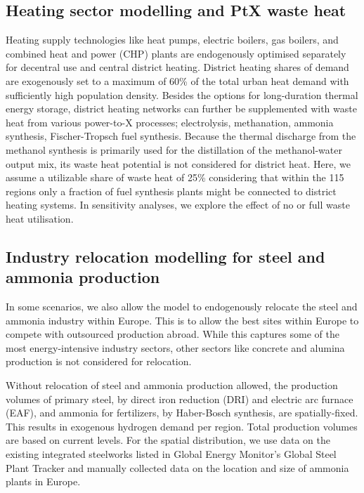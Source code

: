 \subsection*{Heating sector modelling and PtX waste heat}


Heating supply technologies like heat pumps, electric boilers, gas boilers, and
combined heat and power (CHP) plants are endogenously optimised separately for
decentral use and central district heating. District heating shares of demand
are exogenously set to a maximum  of 60\% of the total urban heat demand with
sufficiently high population density. Besides the options for long-duration
thermal energy storage, district heating networks can further be supplemented
with waste heat from various power-to-X processes; electrolysis, methanation,
ammonia synthesis, Fischer-Tropsch fuel synthesis. Because the thermal discharge
from the methanol synthesis is primarily used for the distillation of the
methanol-water output mix,\cite{brownUltralongdurationEnergyStorage2023} its
waste heat potential is not considered for district heat. Here, we assume a
utilizable share of waste heat of 25\% considering that within the 115 regions
only a fraction of fuel synthesis plants might be connected to district heating
systems. In sensitivity analyses, we explore the effect of no or full waste heat
utilisation.


\subsection*{Industry relocation modelling for steel and ammonia production}

In some scenarios, we also allow the model to endogenously relocate the steel
and ammonia industry within Europe. This is to allow the best sites within
Europe to compete with outsourced production abroad. While this captures some of
the most energy-intensive industry sectors, other sectors like concrete and
alumina production is not considered for relocation.

Without relocation of steel and ammonia production allowed, the production volumes of primary steel, by
direct iron reduction (DRI) and electric arc furnace (EAF), and ammonia for
fertilizers, by Haber-Bosch synthesis, are spatially-fixed. This results in
exogenous hydrogen demand per region. Total production volumes are based on
current
levels.\cite{unitedstatesgeologicalsurveyAmmoniaProductionCountry2022,europeancommission.jointresearchcentre.JRCIDEES2021IntegratedDatabase2024}
For the spatial distribution, we use data on the existing integrated steelworks
listed in Global Energy Monitor's Global Steel Plant Tracker
\cite{globalenergymonitorGlobalSteelPlant2024} and manually collected data on
the location and size of ammonia plants in Europe.

